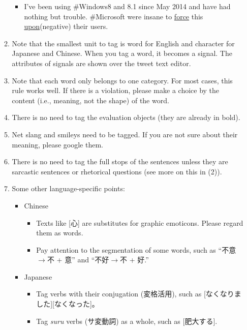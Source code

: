 \documentclass[english]{jnlp_1.4}
\begin{document}
\begin{enumerate}
\begin{enumerate}
			\begin{itemize}
				\item[\CheckedBox] {\sf I've been using \#Windows8 and 8.1 since May 2014 and have had nothing but trouble. \#Microsoft were insane to \underline{force} this \underline{upon}{\boldsf (negative)} their users.}
			\end{itemize}
		\item Note that the smallest unit to tag is word for English and character for Japanese and Chinese. When you tag a word, it becomes a signal. The attributes of signals are shown over the tweet text editor.
		\item Note that each word only belongs to one category. For most cases, this rule works well. If there is a violation, please make a choice by the content (i.e., meaning, not the shape) of the word.
		\item There is no need to tag the evaluation objects (they are already in bold).
		\item Net slang and smileys need to be tagged. If you are not sure about their meaning, please google them.
		\item There is no need to tag the full stops of the sentences unless they are sarcastic sentences or rhetorical questions (see more on this in (2)).
		\item Some other language-specific points:
		\begin{itemize}
			\item Chinese
			\begin{itemize}
			\renewcommand{\labelitemii}{}
				\item Texts like [心] are substitutes for graphic emoticons. Please regard them as words.
				\item Pay attention to the segmentation of some words, such as ``不意$\rightarrow$不 + 意'' and ``不好$\rightarrow$不 + 好.''
			\end{itemize}
			\item Japanese
			\begin{itemize}
			\renewcommand{\labelitemii}{}
				\item Tag verbs with their conjugation (変格活用), such as [なくなりました][なくなった]。
				\item Tag {\em suru} verbs (サ変動詞) as a whole, such as [肥大する].
			\end{itemize}
		\end{itemize}
	\end{enumerate}
	

\end{enumerate}
\end{document}
